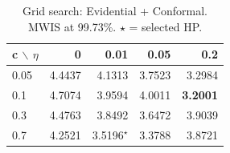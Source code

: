 \begin{table}[t]
\centering
\caption{Grid search: Evidential + Conformal. MWIS at 99.73\%. $\star$ = selected HP.}
\label{tab:supp:gridsearch_mwis_q9973}
\begin{tabular}{lrrrr}
\toprule
c $\backslash$ $\eta$ & 0 & 0.01 & 0.05 & 0.2 \\
\midrule
0.05 & 4.4437 & 4.1313 & 3.7523 & 3.2984 \\
0.1 & 4.7074 & 3.9594 & 4.0011 & \textbf{3.2001} \\
0.3 & 4.4763 & 3.8492 & 3.6472 & 3.9039 \\
0.7 & 4.2521 & 3.5196$^{\star}$ & 3.3788 & 3.8721 \\
\bottomrule
\end{tabular}
\end{table}


